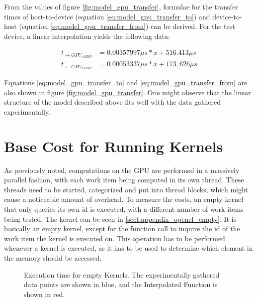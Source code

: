 From the values of figure \ref{fig:model_gpu_transfer}, formulae for the transfer times of host-to-device (equation \ref{eq:model_gpu_transfer_to}) and device-to-host (equation \ref{eq:model_gpu_transfer_from}) can be derived. For the test device, a linear interpolation yields the following data:

\begin{align}
	\label{eq:model_gpu_transfer_to} t_{\rightarrow GPU_{rMBP}} &= 0.00357997\mu s * x + 516.413\mu s\\
	\label{eq:model_gpu_transfer_from} t_{\leftarrow GPU_{rMBP}} &= 0.00053337\mu s * x + 173,626\mu s
\end{align}

Equations \ref{eq:model_gpu_transfer_to} and \ref{eq:model_gpu_transfer_from} are also shown in figure \ref{fig:model_gpu_transfer}. One might observe that the linear structure of the model described above fits well with the data gathered experimentally.

\newpage


\section{Base Cost for Running Kernels}
\label{sect:model_runtime}
As previously noted, computations on the GPU are performed in a massively parallel fashion, with each work item being computed in its own thread. These threads need to be started, categorized and put into thread blocks, which might cause a noticeable amount of overhead. To measure the costs, an empty kernel that only queries its own id is executed, with a different number of work items being tested. The kernel can be seen in \ref{sect:appendix_opencl_empty}. It is basically an empty kernel, except for the function call to inquire the id of the work item the kernel is executed on. This operation has to be performed whenever a kernel is executed, as it has to be used to determine which element in the memory should be accessed. \\

\begin{figure}[h]
	\begin{center}
		\caption{Execution time for empty Kernels. The experimentally gathered data points are shown in blue, and the Interpolated Function is shown in red.}
		\label{fig:model_empty_kernel}
	\end{center}
\end{figure}

